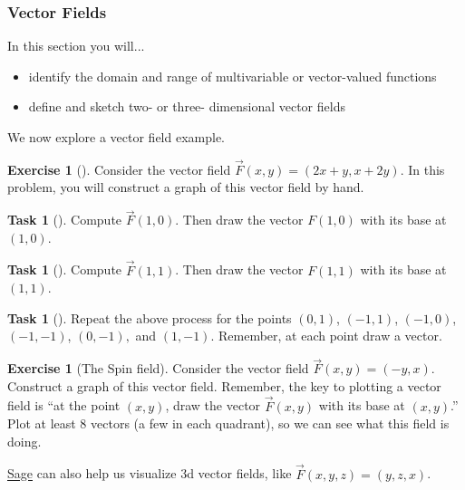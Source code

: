 \documentclass[10pt,]{book}
\theoremstyle{plain}
\theoremstyle{definition}
\theoremstyle{definition}
\theoremstyle{definition}
\theoremstyle{definition}
\newtheorem{exploration}[project]{Exercise}
\newtheorem{task}[project]{Task}
\theoremstyle{definition}
\numberwithin{equation}{section}
\begin{document}
\subsubsection[{Vector Fields}]{Vector Fields}\label{subsubsection-2}
In this section you will... \leavevmode%
\begin{itemize}[label=\textbullet]
\item{}identify the domain and range of multivariable or vector-valued functions%
\item{}define and sketch two- or three- dimensional vector fields%
\end{itemize}
%
\par
We now explore a vector field example.%
\begin{exploration}[]\label{exploration-119}
Consider the vector field \(\vec F(x,y)=(2x+y,x+2y)\). In this problem, you will construct a graph of this vector field by hand.%
\begin{task}[]\label{task-240}
Compute \(\vec F(1,0)\). Then draw the vector \(F(1,0)\) with its base at \((1,0)\).%
\end{task}
\begin{task}[]\label{task-241}
Compute \(\vec F(1,1)\). Then draw the vector \(F(1,1)\) with its base at \((1,1)\).%
\end{task}
\begin{task}[]\label{task-242}
Repeat the above process for the points \((0,1)\), \((-1,1)\), \((-1,0)\), \((-1,-1)\), \((0,-1),\) and \((1,-1)\). Remember, at each point draw a vector.%
\end{task}
\end{exploration}
\begin{exploration}[The Spin field]\label{exploration-120}
Consider the vector field \(\vec F(x,y)=(-y,x)\). Construct a graph of this vector field. Remember, the key to plotting a vector field is ``at the point \((x,y)\), draw the vector \(\vec F(x,y)\) with its base at \((x,y)\).'' Plot at least 8 vectors (a few in each quadrant), so we can see what this field is doing.%
\end{exploration}
\href{http://aleph.sagemath.org/?z=eJxz06jQqdSp0lSwVdAA0joVmlwFOfkl8WWpySX5RfFpmak5KcYpGm46CkCFusY6xpo6IIUQlkYVhKEJAOGFExs}{Sage} can also help us visualize 3d vector fields, like \(\vec F(x,y,z)=(y,z,x)\).%
\typeout{************************************************}
\typeout{************************************************}
\end{document}
